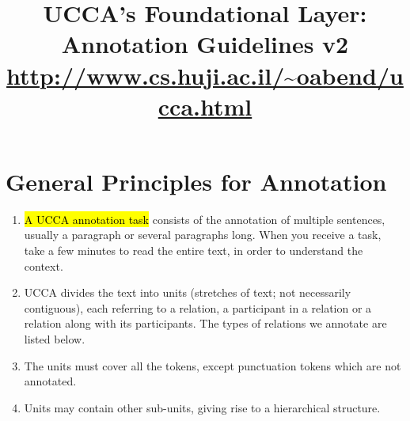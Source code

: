 \documentclass[11pt]{article}
\title{UCCA's Foundational Layer:  Annotation Guidelines v2\\
\url{http://www.cs.huji.ac.il/~oabend/ucca.html}}
\newcommand{\dcom}[1]{\textit{\color{blue}{#1}}}
\begin{document}
\maketitle
\tableofcontents

\newpage


\section{General Principles for Annotation}

\begin{enumerate}

\item
  \hl{A UCCA annotation task} consists of the annotation of multiple sentences, usually a 
  paragraph or several paragraphs long.
  When you receive a task, take a few minutes to read the entire text, in order to 
  understand the context.
    

 \item
  UCCA divides the text into units (stretches of text; not necessarily contiguous), each referring to a relation,
  a participant in a relation or a relation along with its participants. The types of relations we annotate
  are listed below.






\item
  The units must cover all the tokens, except punctuation tokens which are not annotated.
  
\item
  Units may contain other sub-units, giving rise to a hierarchical structure.
  

\end{enumerate}
\end{document}
